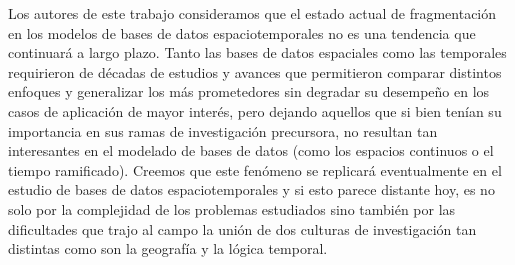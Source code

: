 Los autores de este trabajo consideramos que el estado actual de fragmentación en los modelos de bases de datos espaciotemporales no es una tendencia que continuará a largo plazo. Tanto las bases de datos espaciales como las temporales requirieron de décadas de estudios y avances que permitieron comparar distintos enfoques y generalizar los más prometedores sin degradar su desempeño en los casos de aplicación de mayor interés, pero dejando aquellos que si bien tenían su importancia en sus ramas de investigación precursora, no resultan tan interesantes en el modelado de bases de datos (como los espacios continuos o el tiempo ramificado). Creemos que este fenómeno se replicará eventualmente en el estudio de bases de datos espaciotemporales y si esto parece distante hoy, es no solo por la complejidad de los problemas estudiados sino también por las dificultades que trajo al campo la unión de dos culturas de investigación tan distintas como son la geografía y la lógica temporal.
